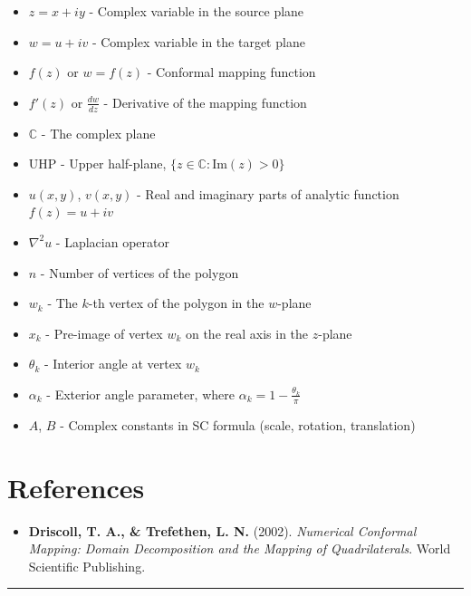 \documentclass[12pt,a4paper]{article}
\begin{document}
\begin{itemize}
\item $z = x + iy$ - Complex variable in the source plane
\item $w = u + iv$ - Complex variable in the target plane
\item $f(z)$ or $w = f(z)$ - Conformal mapping function
\item $f'(z)$ or $\frac{dw}{dz}$ - Derivative of the mapping function
\item $\mathbb{C}$ - The complex plane
\item UHP - Upper half-plane, $\{z \in \mathbb{C} : \text{Im}(z) > 0\}$
\item $u(x, y)$, $v(x, y)$ - Real and imaginary parts of analytic function $f(z) = u + iv$
\item $\nabla^2 u$ - Laplacian operator
\item $n$ - Number of vertices of the polygon
\item $w_k$ - The $k$-th vertex of the polygon in the $w$-plane
\item $x_k$ - Pre-image of vertex $w_k$ on the real axis in the $z$-plane
\item $\theta_k$ - Interior angle at vertex $w_k$
\item $\alpha_k$ - Exterior angle parameter, where $\alpha_k = 1 - \frac{\theta_k}{\pi}$
\item $A$, $B$ - Complex constants in SC formula (scale, rotation, translation)
\end{itemize}

\section*{References}

\begin{itemize}
\item \textbf{Driscoll, T. A., \& Trefethen, L. N.} (2002). \textit{Numerical Conformal Mapping: Domain Decomposition and the Mapping of Quadrilaterals}. World Scientific Publishing.
\end{itemize}


\begin{center}\rule{0.5\linewidth}{0.5pt}\end{center}
\end{document}

